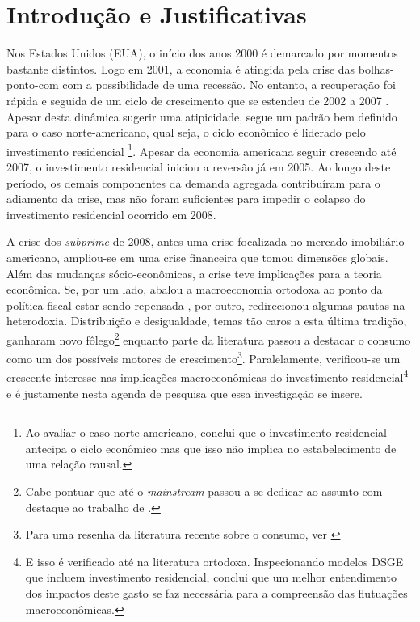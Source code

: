 \section{Introdução e Justificativas}\label{Intro}





Nos Estados Unidos (EUA), o início dos anos 2000 é demarcado por momentos bastante distintos. Logo em 2001, a economia é atingida pela crise das bolhas-ponto-com com a possibilidade de uma recessão. No entanto, a recuperação foi rápida e seguida de um ciclo de crescimento que se estendeu de 2002 a 2007 \cite{cagnin_o_2007}. Apesar desta dinâmica sugerir uma atipicidade, segue um padrão bem definido para o caso norte-americano, qual seja, o ciclo econômico é liderado pelo investimento residencial \cites{green_follow_1997}{leamer_housing_2007}{fiebiger_trend_2017}\footnote{
	Ao avaliar o caso norte-americano, \textcite{green_follow_1997} conclui que o investimento residencial antecipa o ciclo econômico mas que isso não implica no estabelecimento de uma relação causal. 
}. Apesar da economia americana seguir crescendo até 2007, o investimento residencial iniciou a reversão já em 2005. Ao longo deste período, os demais componentes da demanda agregada contribuíram para o adiamento da crise, mas não foram suficientes para impedir o colapso do investimento residencial ocorrido em 2008. 

A crise dos \textit{subprime} de 2008, antes uma crise focalizada no mercado imobiliário americano, ampliou-se em uma crise financeira que tomou dimensões globais. Além das mudanças sócio-econômicas, a crise teve implicações para a teoria econômica. Se, por um lado, abalou a macroeconomia ortodoxa ao ponto da política fiscal estar sendo repensada \cite{blanchard_rethinking_2017}, por outro, redirecionou algumas pautas na heterodoxia. Distribuição e desigualdade, temas tão caros a esta última tradição, ganharam novo fôlego\footnote{Cabe pontuar que até o \textit{mainstream} passou a se dedicar ao assunto com destaque ao trabalho de \textcite{piketty_o_2014}.} \cites{carvalho_personal_2016}{ederer_will_2019} enquanto parte da literatura passou a destacar o consumo como um dos possíveis motores de crescimento\footnote{Para uma resenha da literatura recente sobre o consumo, ver \textcite{brochier_macroeconomics_2017}}. Paralelamente, verificou-se um crescente interesse nas implicações macroeconômicas do investimento residencial\footnote{E isso é verificado até na literatura ortodoxa. Inspecionando modelos DSGE que incluem investimento residencial, \textcite{iacoviello_housing_2010} conclui que um melhor entendimento dos impactos deste gasto se faz necessária para a compreensão das flutuações macroeconômicas.} \cites{teixeira_crescimento_2015}{fiebiger_semi-autonomous_2018} e é justamente nesta agenda de pesquisa que essa investigação se insere. 

